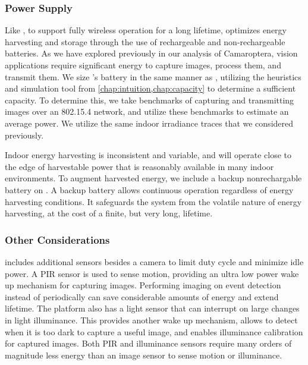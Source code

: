 \subsubsection{Power Supply}
Like \name, to support fully wireless operation for a long lifetime, \namec optimizes energy harvesting and storage through the use of rechargeable and non-rechargeable batteries.
As we have explored previously in our analysis of Camaroptera, vision applications require significant energy to capture images, process them, and transmit them. 
We size \namec's battery in the same manner as \name, utilizing the heuristics and simulation tool from \cref{chap:intuition,chap:capacity} to determine a sufficient capacity.
To determine this, we take benchmarks of capturing and transmitting images over an 802.15.4 network, and utilize these benchmarks to estimate an average power.
We utilize the same indoor irradiance traces that we considered previously.

Indoor energy harvesting is inconsistent and variable, and \namec will operate close to the edge of harvestable power that is reasonably available in many indoor environments.
To augment harvested energy, we include a backup nonrechargable battery on \namec. A backup battery allows continuous operation regardless of energy harvesting conditions. 
It safeguards the system from the volatile nature of energy harvesting, at the cost of a finite, but very long, lifetime.

\subsubsection{Other Considerations}
\namec includes additional sensors besides a camera to limit duty cycle and minimize idle power. A PIR sensor is used to sense motion, providing an ultra low power wake up mechanism for capturing images. Performing imaging on event detection instead of periodically can save considerable amounts of energy and extend lifetime. The platform also has a light sensor that can interrupt on large changes in light illuminance. This provides another wake up mechanism, allows \namec to detect when it is too dark to capture a useful image, and enables illuminance calibration for captured images. Both PIR and illuminance sensors require many orders of magnitude less energy than an image sensor to sense motion or illuminance.


